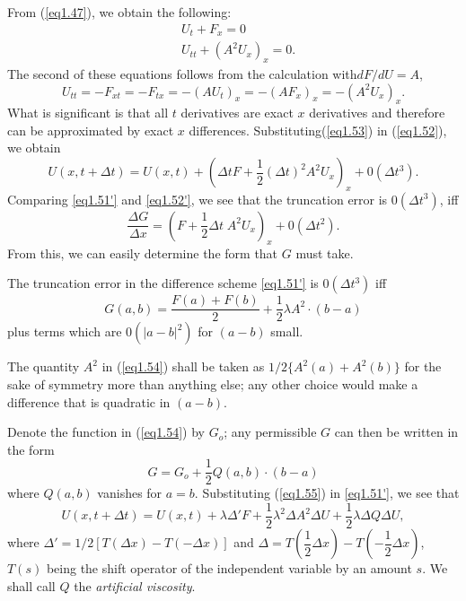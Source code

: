 From (\ref{eq1.47}), we obtain the  following:
\begin{equation*}
\begin{split}
& U_t + F_x = 0 \\
& U_{tt} + (A^2 U_x)_x = 0. 
\end{split}\tag{1.53}\label{eq1.53}
\end{equation*}
The second of these equations follows from the calculation with\break $dF/dU = A$,
$$
U_{tt} = -F_{xt} = - F_{tx} = -(AU_t)_x = -(AF_x)_x = -(A^2 U_x)_x.
$$
What is significant is that all $t$ derivatives are exact $x$
derivatives and therefore can be approximated by exact $x$
differences. Substituting\break (\ref{eq1.53}) in (\ref{eq1.52}), we obtain 
\begin{equation*}
U(x,t + \Delta t) = U(x,t) + (\Delta t F + \frac{1}{2} (\Delta t)^2 A^2 U_x)_x + 0 (\Delta t^3). \tag*{$(1.52)'$} \label{eq1.52'}
\end{equation*}
Comparing \ref{eq1.51'} and \ref{eq1.52'}, we see that the truncation error is $0(\Delta t^3)$, iff 
$$
\frac{\Delta G}{\Delta x} = (F + \frac{1}{2} \Delta t \; A^2 U_x)_x + 0 (\Delta t^2). 
$$\pageoriginale
From this, we can easily determine the form that $G$ must take.

\begin{theorem*}
The truncation error in the difference scheme \ref{eq1.51'} is $0(\Delta t^3)$ iff
\begin{equation*}
G(a,b) = \frac{F(a) + F(b)}{2} + \frac{1}{2} \lambda A^2 \cdot (b-a) \tag{1.54}\label{eq1.54}
\end{equation*}
plus terms which are $0(|a-b|^2)$ for $(a-b)$ small.
\end{theorem*}

The quantity $A^2$ in (\ref{eq1.54}) shall be taken as $1/2 \{A^2 (a) + A^2 (b)\}$ for the sake of symmetry more than anything else; any other choice would make a difference that is quadratic in $(a-b)$.

Denote the function in (\ref{eq1.54}) by $G_o$; any permissible $G$ can then be written in the form 
\begin{equation*}
G = G_o + \frac{1}{2} Q (a,b) \cdot (b-a)\tag{1.55}\label{eq1.55}
\end{equation*}
where $Q(a,b)$ vanishes for $a=b$. Substituting (\ref{eq1.55}) in \ref{eq1.51'}, we see that
\begin{equation*}
U(x,t + \Delta t) = U (x,t) + \lambda \Delta' F + \frac{1}{2} \lambda^2 \Delta A^2 \Delta U + \frac{1}{2} \lambda \Delta Q \Delta U, \tag{1.56}\label{eq1.56}
\end{equation*}
where $\Delta' = 1/2 [T (\Delta x) - T (-\Delta x)]$ and $\Delta = T (\dfrac{1}{2} \Delta x) - T (-\dfrac{1}{2} \Delta x)$, $T(s)$ being the shift operator of the independent variable by an amount $s$. We shall call $Q$ the {\em artificial viscosity}.

